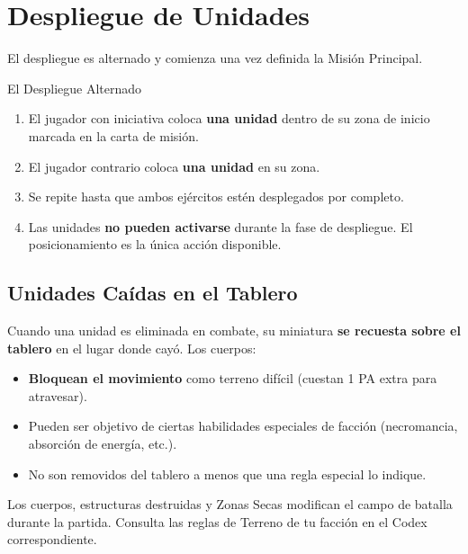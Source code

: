 \section{Despliegue de Unidades}

El despliegue es alternado y comienza una vez definida la Misión Principal.

\begin{reglaespecial}{El Despliegue Alternado}
\begin{enumerate}
    \item El jugador con iniciativa coloca \textbf{una unidad} dentro de su zona de inicio marcada en la carta de misión.
    \item El jugador contrario coloca \textbf{una unidad} en su zona.
    \item Se repite hasta que ambos ejércitos estén desplegados por completo.
    \item Las unidades \textbf{no pueden activarse} durante la fase de despliegue. El posicionamiento es la única acción disponible.
\end{enumerate}
\end{reglaespecial}

\subsection*{Unidades Caídas en el Tablero}

Cuando una unidad es eliminada en combate, su miniatura \textbf{se recuesta sobre el tablero} en el lugar donde cayó. Los cuerpos:

\begin{itemize}
    \item \textbf{Bloquean el movimiento} como terreno difícil (cuestan 1 PA extra para atravesar).
    \item Pueden ser objetivo de ciertas habilidades especiales de facción (necromancia, absorción de energía, etc.).
    \item No son removidos del tablero a menos que una regla especial lo indique.
\end{itemize}

\begin{tcolorbox}[colback=GoldRule!10, colframe=GoldRule, title=\textbf{REGLA: Terreno y Obstáculos}]
\small Los cuerpos, estructuras destruidas y Zonas Secas modifican el campo de batalla durante la partida. Consulta las reglas de Terreno de tu facción en el Codex correspondiente.
\end{tcolorbox}
